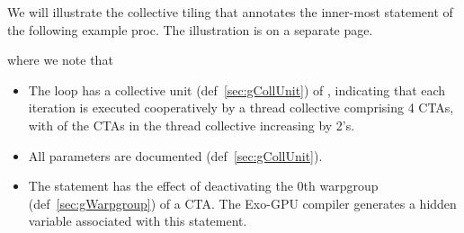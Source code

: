 
We will illustrate the collective tiling that annotates the inner-most statement of the following example proc.
The illustration is on a separate page.

\filbreak


where we note that
\begin{itemize}
  \item The \texttt{} loop has a collective unit (def~\ref{sec:gCollUnit}) of , indicating that each iteration is executed cooperatively by a thread collective comprising 4 CTAs, with  of the CTAs in the thread collective increasing by 2's.
  \item All  parameters are documented (def~\ref{sec:gCollUnit}).
  \item The  statement has the effect of deactivating the 0th warpgroup (def~\ref{sec:gWarpgroup}) of a CTA.
    The Exo-GPU compiler generates a hidden  variable associated with this statement.
\end{itemize}

